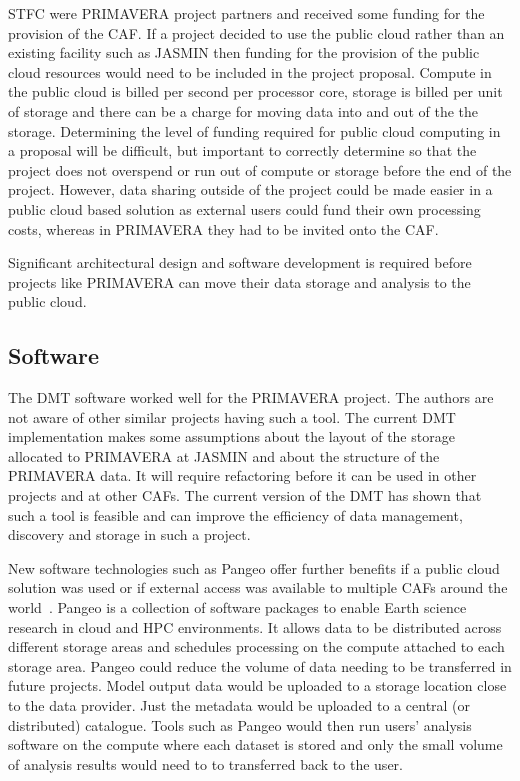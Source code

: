 \documentclass[gmd, manuscript]{copernicus}
\begin{document}
STFC were PRIMAVERA project partners and received some funding for the provision of the CAF. If a project decided to use the public cloud rather than an existing facility such as JASMIN then funding for the provision of the public cloud resources would need to be included in the project proposal. Compute in the public cloud is billed per second per processor core, storage is billed per unit of storage and there can be a charge for moving data into and out of the the storage. Determining the level of funding required for public cloud computing in a proposal will be difficult, but important to correctly determine so that the project does not overspend or run out of compute or storage before the end of the project. However, data sharing outside of the project could be made easier in a public cloud based solution as external users could fund their own processing costs, whereas in PRIMAVERA they had to be invited onto the CAF.

Significant architectural design and software development is required before projects like PRIMAVERA can move their data storage and analysis to the public cloud.

\subsection{Software}

The DMT software worked well for the PRIMAVERA project. The authors are not aware of other similar projects having such a tool. The current DMT implementation makes some assumptions about the layout of the storage allocated to PRIMAVERA at JASMIN and about the structure of the PRIMAVERA data. It will require refactoring before it can be used in other projects and at other CAFs. The current version of the DMT has shown that such a tool is feasible and can improve the efficiency of data management, discovery and storage in such a project.

New software technologies such as Pangeo offer further benefits if a public cloud solution was used or if external access was available to multiple CAFs around the world~\citep{Pangeo}. Pangeo is a collection of software packages to enable Earth science research in cloud and HPC environments. It allows data to be distributed across different storage areas and schedules processing on the compute attached to each storage area. Pangeo could reduce the volume of data needing to be transferred in future projects. Model output data would be uploaded to a storage location close to the data provider. Just the metadata would be uploaded to a central (or distributed) catalogue. Tools such as Pangeo would then run users' analysis software on the compute where each dataset is stored and only the small volume of analysis results would need to to transferred back to the user.
\end{document}
